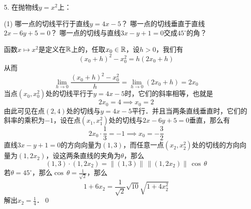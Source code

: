 5. 在抛物线$y=x^2$上：
\begin{tasks}(1)
    \task 哪一点的切线平行于直线$y=4x-5$？ 
    \task 哪一点的切线垂直于直线$2x-6y+5=0$？ 
    \task 哪一点的切线与直线$3x-y+1=0$交成$45^{\circ}$的角？
\end{tasks}

\solve 函数$x \mapsto x^2$是定义在$\mathbb{R}$上的，任取$x_0 \in \mathbb{R}$，设$h > 0$，我们有
\begin{equation}
    (x_0 + h)^2 - x_0^2 = h(2x_0 + h)
\end{equation}
从而
\begin{equation}
    \lim_{h \to 0} \frac{\left(x_0+h\right)^2-x_0^2}{h} = \lim_{h \to 0} \left( 2x_0 + h\right) = 2x_0
\end{equation}
当点$(x_0, x_0^2)$处的切线平行于$y=4x-5$时，它们的斜率相等，也就是
\begin{equation}
    2x_0 = 4 \implies x_0 = 2
\end{equation}
由此可见在点$(2, 4)$处的切线与$y=4x-5$平行．并且当两条直线垂直时，它们的斜率的乘积为$-1$，设在点$(x_1, x_1^2)$处的切线与$2x-6y+5=0$垂直，那么有
\begin{equation}
    2x_0 \cdot \frac{1}{3} = -1 \implies x_0 = -\frac{3}{2}
\end{equation}
直线$3x-y+1=0$的方向向量为$(1, 3)$，而任意一点$(x_2, x_2^2)$处的切线的方向向量为$(1, 2x_2)$，设这两条直线的夹角为$\theta$，那么
\begin{equation}
    (1, 3) \cdot (1, 2x_2) = \lVert (1, 3) \rVert \, \lVert (1, 2x_2) \rVert \, \cos \, \theta 
\end{equation}
若$\theta = 45^\circ$，那么$\cos \, \theta = \displaystyle\frac{1}{\sqrt{2}}$，那么
\begin{equation}
    1 + 6 x_2 = \frac{1}{\sqrt{2}} \sqrt{10} \sqrt{1 + 4x_2^2}
\end{equation}
解出$x_2 = \displaystyle\frac{1}{4}$．\qed\bigskip